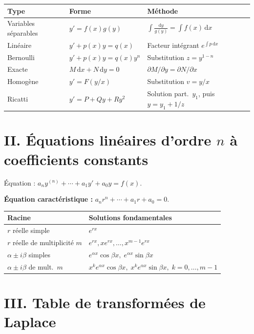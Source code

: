 \documentclass[12pt,a4paper,openany]{book}
\theoremstyle{definition}
\theoremstyle{plain}
\theoremstyle{remark}
\newcommand{\dd}{\mathrm{d}}
\begin{document}
\renewcommand{\arraystretch}{1.6}
\begin{center}
\begin{tabular}{p{4.2cm} p{4cm} p{5.5cm}}
\toprule
\textbf{Type} & \textbf{Forme} & \textbf{Méthode} \\
\midrule
Variables séparables &
$y' = f(x)g(y)$ &
$\displaystyle\int \frac{\dd y}{g(y)} = \int f(x)\,\dd x$ \\
Linéaire &
$y' + p(x)y = q(x)$ &
Facteur intégrant $e^{\int p\,\dd x}$ \\
Bernoulli &
$y' + p(x)y = q(x)y^n$ &
Substitution $z = y^{1-n}$ \\
Exacte &
$M\,\dd x + N\,\dd y = 0$ &
$\partial M/\partial y = \partial N/\partial x$ \\
Homogène &
$y' = F(y/x)$ &
Substitution $v = y/x$ \\
Ricatti &
$y' = P + Qy + Ry^2$ &
Solution part.\ $y_1$, puis $y = y_1 + 1/z$ \\
\bottomrule
\end{tabular}
\end{center}

\section*{II. Équations linéaires d'ordre $n$ à coefficients constants}

Équation : $a_n y^{(n)} + \cdots + a_1 y' + a_0 y = f(x)$.

\medskip
\noindent\textbf{Équation caractéristique :}
$a_n r^n + \cdots + a_1 r + a_0 = 0$.

\medskip
\renewcommand{\arraystretch}{1.5}
\begin{center}
\begin{tabular}{p{4.5cm} p{8cm}}
\toprule
\textbf{Racine} & \textbf{Solutions fondamentales} \\
\midrule
$r$ réelle simple & $e^{rx}$ \\
$r$ réelle de multiplicité $m$ &
$e^{rx}, xe^{rx}, \ldots, x^{m-1}e^{rx}$ \\
$\alpha \pm i\beta$ simples &
$e^{\alpha x}\cos\beta x,\; e^{\alpha x}\sin\beta x$ \\
$\alpha \pm i\beta$ de mult.\ $m$ &
$x^k e^{\alpha x}\cos\beta x,\;
 x^k e^{\alpha x}\sin\beta x,\; k=0,\ldots,m-1$ \\
\bottomrule
\end{tabular}
\end{center}

\section*{III. Table de transformées de Laplace}
\end{document}
